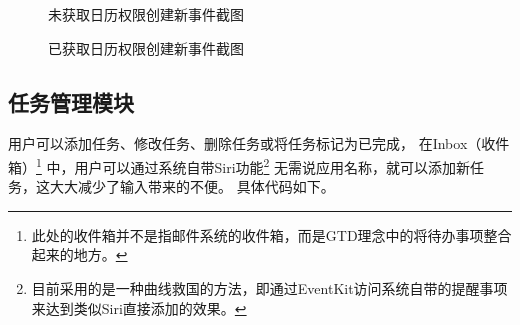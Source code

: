 \begin{figure}[H]
	\centering
	\caption{未获取日历权限创建新事件截图}
\end{figure}

\begin{figure}[H]
	\centering
	\caption{已获取日历权限创建新事件截图}
\end{figure}

\subsection{任务管理模块}
用户可以添加任务、修改任务、删除任务或将任务标记为已完成，
在Inbox（收件箱）\footnote{此处的收件箱并不是指邮件系统的收件箱，而是GTD理念中的将待办事项整合起来的地方。}
中，用户可以通过系统自带Siri功能\footnote{目前采用的是一种曲线救国的方法，即通过EventKit访问系统自带的提醒事项来达到类似Siri直接添加的效果。}
无需说应用名称，就可以添加新任务，这大大减少了输入带来的不便。
具体代码如下。

